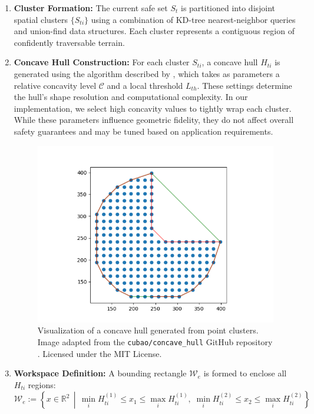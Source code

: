 \begin{enumerate}
    \item \textbf{Cluster Formation:} The current safe set \( S_t \) is partitioned into disjoint spatial clusters \( \{ S_{ti} \} \) using a combination of KD-tree nearest-neighbor queries and union-find data structures. Each cluster represents a contiguous region of confidently traversable terrain.

    \item \textbf{Concave Hull Construction:} For each cluster \( S_{ti} \), a concave hull \( H_{ti} \) is generated using the algorithm described by \textcite{park2013concavehull}, which takes as parameters a relative concavity level \( \mathcal{C} \) and a local threshold \( L_{th} \). These settings determine the hull’s shape resolution and computational complexity. In our implementation, we select high concavity values to tightly wrap each cluster. While these parameters influence geometric fidelity, they do not affect overall safety guarantees and may be tuned based on application requirements.

    \begin{figure}[h]
        \centering
        \includegraphics[width=0.7\linewidth]{figures/concave_hull_example.png}
        \caption{Visualization of a concave hull generated from point clusters. Image adapted from the \texttt{cubao/concave\_hull} GitHub repository \cite{cubao2024concavehull}. Licensed under the MIT License.}
        \label{fig:concave-hull}
    \end{figure}


    \item \textbf{Workspace Definition:} A bounding rectangle \( \mathcal{W}_e \) is formed to enclose all \( H_{ti} \) regions:
    \begin{equation}
    \mathcal{W}_e := \left\{ x \in \mathbb{R}^2 \,\middle|\, \min_i H_{ti}^{(1)} \leq x_1 \leq \max_i H_{ti}^{(1)},\; \min_i H_{ti}^{(2)} \leq x_2 \leq \max_i H_{ti}^{(2)} \right\}
    \end{equation}


\end{enumerate}
